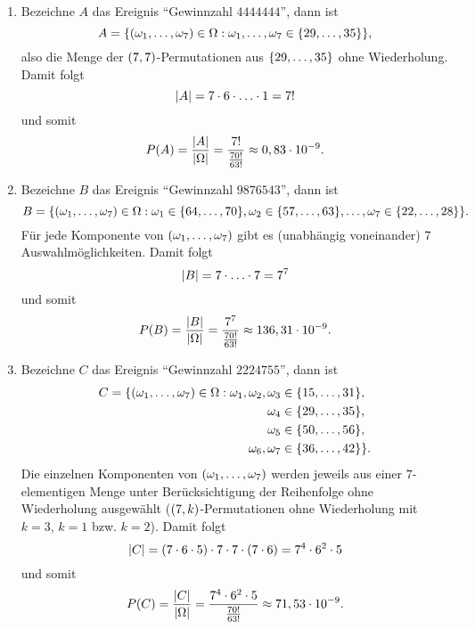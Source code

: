 \documentclass{exercise}
\begin{document}
    \begin{enumerate}
        \item Bezeichne \(A\) das Ereignis ``Gewinnzahl \(4444444\)'', dann ist
        \[
            A = \braces*{\parentheses*{\omega_1, \ldots, \omega_7} \in \Omega : \omega_1, \ldots, \omega_7 \in \braces*{29, \ldots, 35}},
        \]
        also die Menge der \(\parentheses*{7, 7}\)-Permutationen aus \(\braces*{29, \ldots, 35}\) ohne Wiederholung.
        Damit folgt
        \[
            \absolute*{A} = 7 \cdot 6 \cdot \ldots \cdot 1 = 7!
        \]
        und somit
        \[
            P\parentheses*{A} = \frac{\absolute*{A}}{\absolute*{\Omega}} = \frac{7!}{\frac{70!}{63!}} \approx 0,83 \cdot 10^{-9}.
        \]
        \item Bezeichne \(B\) das Ereignis ``Gewinnzahl \(9876543\)'', dann ist
        \[
            B = \braces*{\parentheses*{\omega_1, \ldots, \omega_7} \in \Omega : \omega_1 \in \braces*{64, \ldots, 70}, \omega_2 \in \braces*{57, \ldots, 63}, \ldots, \omega_7 \in \braces*{22, \ldots, 28}}.
        \]
        Für jede Komponente von \(\parentheses*{\omega_1, \ldots, \omega_7}\) gibt es (unabhängig voneinander) \(7\) Auswahlmöglichkeiten.
        Damit folgt
        \[
            \absolute*{B} = 7 \cdot \ldots \cdot 7 = 7^7
        \]
        und somit
        \[
            P\parentheses*{B} = \frac{\absolute*{B}}{\absolute*{\Omega}} = \frac{7^7}{\frac{70!}{63!}} \approx 136,31 \cdot 10^{-9}.
        \]
        \item Bezeichne \(C\) das Ereignis ``Gewinnzahl \(2224755\)'', dann ist
        \begin{align*}
            C = \{\parentheses*{\omega_1, \ldots, \omega_7} \in \Omega : \omega_1, \omega_2, \omega_3 &\in \braces*{15, \ldots, 31},\\
            \omega_4 &\in \braces*{29, \ldots, 35},\\
            \omega_5 &\in \braces*{50, \ldots, 56},\\
            \omega_6, \omega_7 &\in \braces*{36, \ldots, 42}\}.
        \end{align*}
        Die einzelnen Komponenten von \(\parentheses*{\omega_1, \ldots, \omega_7}\) werden jeweils aus einer \(7\)-elementigen Menge unter Berücksichtigung der Reihenfolge ohne Wiederholung ausgewählt (\(\parentheses*{7, k}\)-Permutationen ohne Wiederholung mit \(k = 3\), \(k = 1\) bzw. \(k = 2\)).
        Damit folgt
        \[
            \absolute*{C} = \parentheses*{7 \cdot 6 \cdot 5} \cdot 7 \cdot 7 \cdot \parentheses*{7 \cdot 6} = 7^4 \cdot 6^2 \cdot 5
        \]
        und somit
        \[
            P\parentheses*{C} = \frac{\absolute*{C}}{\absolute*{\Omega}} = \frac{7^4 \cdot 6^2 \cdot 5}{\frac{70!}{63!}} \approx 71,53 \cdot 10^{-9}.
        \]
    \end{enumerate}
\end{document}
